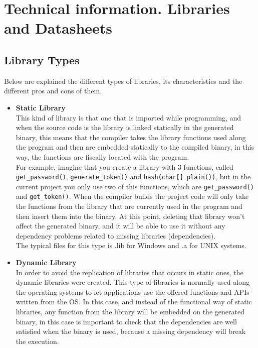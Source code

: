 \chapter{Technical information. Libraries and Datasheets}\label{C:Libraries-Datasheets}
\section{Library Types}\label{S:appendices-libraries-types}
Below are explained the different types of libraries, its characteristics and the different pros and cons of them.
\begin{itemize}
  \item 
  \textbf{Static Library}
  \\
  This kind of library is that one that is imported while programming, and when the source code is the library is linked statically in the generated binary, this means that the compiler takes the library functions used along the program and then are embedded statically to the compiled binary, in this way, the functions are fiscally located with the program. 
\\
For example, imagine that you create a library with 3 functions, called \verb!get_password()!, \verb!generate_token()! and \verb!hash(char[] plain())!,  but in the current project you only use two of this functions, which are \verb!get_password()! and \verb!get_token()!. When the compiler builds the project code will only take the functions from the library that are currently used in the program and then insert them into the binary. At this point, deleting that library won't affect the generated binary, and it will be able to use it without any dependency problems related to missing libraries (dependencies).
\\
The typical files for this type is .lib for Windows and .a for UNIX systems.
  
  \item
  \textbf{Dynamic Library}
  \\
  In order to avoid the replication of libraries that occurs in static ones, the dynamic libraries were created. This type of libraries is normally used along the operating systems to let applications use the offered functions and APIs written from the OS. In this case, and instead of the functional way of static libraries, any function from the library will be embedded on the generated binary, in this case is important to check that the dependencies are well satisfied when the binary is used, because a missing dependency will break the execution.


\end{itemize}
